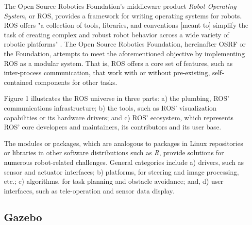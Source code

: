\documentclass[9pt,twocolumn,twoside]{../../styles/osajnl}
\begin{document}
The Open Source Robotics Foundation's middleware product \textit{Robot Operating System}, or ROS, provides a framework for writing operating systems for robots.  ROS offers "a collection of tools, libraries, and conventions [meant to] simplify the task of creating complex and robust robot behavior across a wide variety of robotic platforms" \cite{www-ros-about}. The Open Source Robotics Foundation, hereinafter OSRF or the Foundation, attempts to meet the aforementioned objective by implementing ROS as a modular system.  That is, ROS offers a core set of features, such as inter-process communication, that work with or without pre-existing, self-contained components for other tasks.

Figure 1 illustrates the ROS universe in three parts: a) the plumbing, ROS' communications infrastructure; b) the tools, such as ROS' visualization capabilities or its hardware drivers; and c) ROS' ecosystem, which represents ROS' core developers and maintainers, its contributors and its user base.

The modules or packages, which are analogous to packages in Linux repositories or libraries in other software distributions such as \textit{R}, provide solutions for numerous robot-related challenges.  General categories include a) drivers, such as sensor and actuator interfaces; b) platforms, for steering and image processing, etc.; c) algorithms, for task planning and obstacle avoidance; and, d) user interfaces, such as tele-operation and sensor data display. \cite{www-software-categories}

\subsection{Gazebo} %
\end{document}
